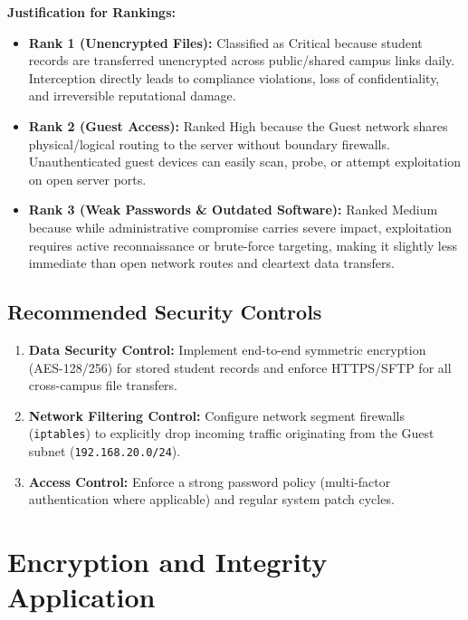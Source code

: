 \documentclass[11pt,a4paper]{article}
\begin{document}
\textbf{Justification for Rankings:}
\begin{itemize}
    \item \textbf{Rank 1 (Unencrypted Files):} Classified as Critical because student records are transferred unencrypted across public/shared campus links daily. Interception directly leads to compliance violations, loss of confidentiality, and irreversible reputational damage.
    \item \textbf{Rank 2 (Guest Access):} Ranked High because the Guest network shares physical/logical routing to the server without boundary firewalls. Unauthenticated guest devices can easily scan, probe, or attempt exploitation on open server ports.
    \item \textbf{Rank 3 (Weak Passwords \& Outdated Software):} Ranked Medium because while administrative compromise carries severe impact, exploitation requires active reconnaissance or brute-force targeting, making it slightly less immediate than open network routes and cleartext data transfers.
\end{itemize}

\subsection{Recommended Security Controls}
\begin{enumerate}
    \item \textbf{Data Security Control:} Implement end-to-end symmetric encryption (AES-128/256) for stored student records and enforce HTTPS/SFTP for all cross-campus file transfers.
    \item \textbf{Network Filtering Control:} Configure network segment firewalls (\texttt{iptables}) to explicitly drop incoming traffic originating from the Guest subnet (\texttt{192.168.20.0/24}).
    \item \textbf{Access Control:} Enforce a strong password policy (multi-factor authentication where applicable) and regular system patch cycles.
\end{enumerate}


\section{Encryption and Integrity Application}
\end{document}
